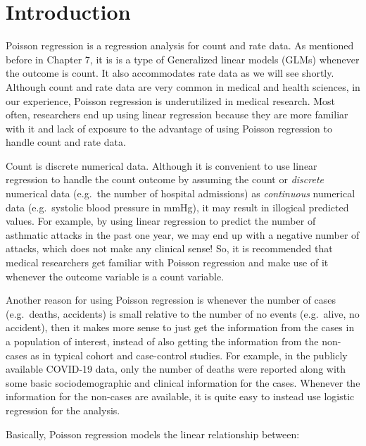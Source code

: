 \documentclass[
  10pt,
]{krantz}
\begin{document}
\hypertarget{introduction-5}{%
\section{Introduction}\label{introduction-5}}

Poisson regression is a regression analysis for count and rate data. As mentioned before in Chapter 7, it is is a type of Generalized linear models (GLMs) whenever the outcome is count. It also accommodates rate data as we will see shortly. Although count and rate data are very common in medical and health sciences, in our experience, Poisson regression is underutilized in medical research. Most often, researchers end up using linear regression because they are more familiar with it and lack of exposure to the advantage of using Poisson regression to handle count and rate data.

Count is discrete numerical data. Although it is convenient to use linear regression to handle the count outcome by assuming the count or \emph{discrete} numerical data (e.g.~the number of hospital admissions) as \emph{continuous} numerical data (e.g.~systolic blood pressure in mmHg), it may result in illogical predicted values. For example, by using linear regression to predict the number of asthmatic attacks in the past one year, we may end up with a negative number of attacks, which does not make any clinical sense! So, it is recommended that medical researchers get familiar with Poisson regression and make use of it whenever the outcome variable is a count variable.

Another reason for using Poisson regression is whenever the number of cases (e.g.~deaths, accidents) is small relative to the number of no events (e.g.~alive, no accident), then it makes more sense to just get the information from the cases in a population of interest, instead of also getting the information from the non-cases as in typical cohort and case-control studies. For example, in the publicly available COVID-19 data, only the number of deaths were reported along with some basic sociodemographic and clinical information for the cases. Whenever the information for the non-cases are available, it is quite easy to instead use logistic regression for the analysis.

Basically, Poisson regression models the linear relationship between:
\end{document}
